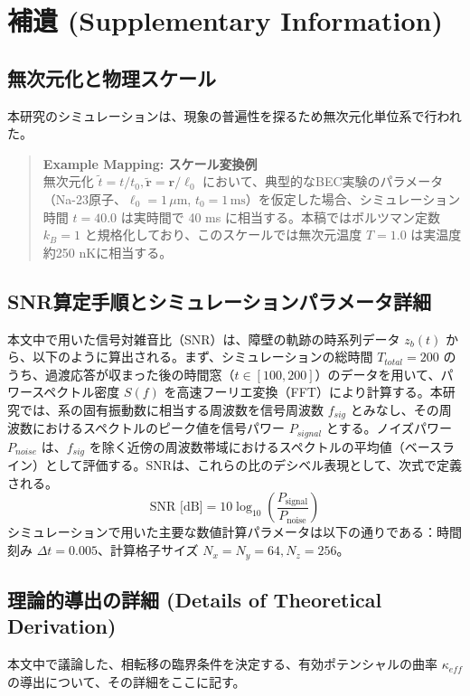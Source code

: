 \documentclass[a4paper,11pt,ja=standard,lualatex]{bxjsarticle}
\begin{document}
\FloatBarrier
\appendix
\renewcommand{\thefigure}{A\arabic{figure}}
\setcounter{figure}{0}

\section{補遺 (Supplementary Information)}

\subsection{無次元化と物理スケール}
本研究のシミュレーションは、現象の普遍性を探るため無次元化単位系で行われた。
\begin{quote}
\textbf{Example Mapping: スケール変換例} \\
無次元化 $\tilde t = t/t_0, \tilde{\mathbf{r}} = \mathbf{r}/\ell_0$ において、典型的なBEC実験のパラメータ（Na-23原子、$\ell_0 = 1\,\mu\text{m}$, $t_0 = 1\,\text{ms}$）を仮定した場合、シミュレーション時間 $t=40.0$ は実時間で 40 ms に相当する。本稿ではボルツマン定数 $k_B=1$ と規格化しており、このスケールでは無次元温度 $T=1.0$ は実温度約250 nKに相当する。
\end{quote}

\subsection{SNR算定手順とシミュレーションパラメータ詳細}
本文中で用いた信号対雑音比（SNR）は、障壁の軌跡の時系列データ $z_b(t)$ から、以下のように算出される。まず、シミュレーションの総時間 $T_{total}=200$ のうち、過渡応答が収まった後の時間窓（$t \in [100, 200]$）のデータを用いて、パワースペクトル密度 $S(f)$ を高速フーリエ変換（FFT）により計算する。本研究では、系の固有振動数に相当する周波数を信号周波数 $f_{sig}$ とみなし、その周波数におけるスペクトルのピーク値を信号パワー $P_{signal}$ とする。ノイズパワー $P_{noise}$ は、$f_{sig}$ を除く近傍の周波数帯域におけるスペクトルの平均値（ベースライン）として評価する。SNRは、これらの比のデシベル表現として、次式で定義される。
\begin{equation}
    \text{SNR [dB]} = 10 \log_{10}\left(\frac{P_{\text{signal}}}{P_{\text{noise}}}\right)
\end{equation}
シミュレーションで用いた主要な数値計算パラメータは以下の通りである：時間刻み $\Delta t = 0.005$、計算格子サイズ $N_x=N_y=64, N_z=256$。

\subsection{理論的導出の詳細 (Details of Theoretical Derivation)}
本文中で議論した、相転移の臨界条件を決定する、有効ポテンシャルの曲率 $\kappa_{eff}$ の導出について、その詳細をここに記す。
\end{document}

